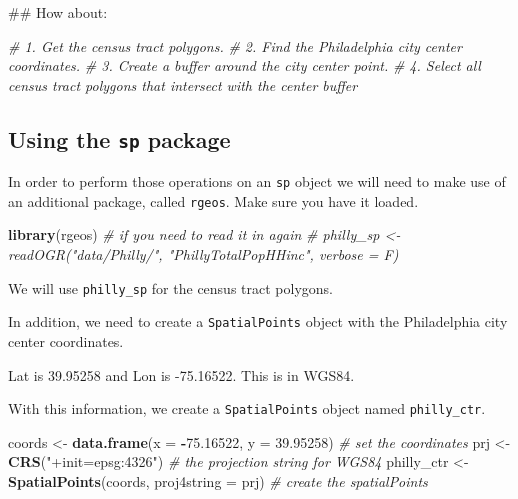 \documentclass[]{book}
\newenvironment{Shaded}{\begin{snugshade}}{\end{snugshade}}
\newcommand{\KeywordTok}[1]{\textcolor[rgb]{0.13,0.29,0.53}{\textbf{#1}}}
\newcommand{\DataTypeTok}[1]{\textcolor[rgb]{0.13,0.29,0.53}{#1}}
\newcommand{\FloatTok}[1]{\textcolor[rgb]{0.00,0.00,0.81}{#1}}
\newcommand{\StringTok}[1]{\textcolor[rgb]{0.31,0.60,0.02}{#1}}
\newcommand{\CommentTok}[1]{\textcolor[rgb]{0.56,0.35,0.01}{\textit{#1}}}
\newcommand{\OperatorTok}[1]{\textcolor[rgb]{0.81,0.36,0.00}{\textbf{#1}}}
\newcommand{\NormalTok}[1]{#1}
\theoremstyle{definition}
\theoremstyle{definition}
\theoremstyle{definition}
\theoremstyle{remark}
\begin{document}
\begin{Shaded}
\begin{Highlighting}[]
\NormalTok{## How about:}

\CommentTok{# 1. Get the census tract polygons.}
\CommentTok{# 2. Find the Philadelphia city center coordinates.}
\CommentTok{# 3. Create a buffer around the city center point.}
\CommentTok{# 4. Select all census tract polygons that intersect with the center buffer}
\end{Highlighting}
\end{Shaded}

\subsection{\texorpdfstring{Using the \texttt{sp}
package}{Using the sp package}}\label{using-the-sp-package}

In order to perform those operations on an \texttt{sp} object we will
need to make use of an additional package, called \texttt{rgeos}. Make
sure you have it loaded.

\begin{Shaded}
\begin{Highlighting}[]
\KeywordTok{library}\NormalTok{(rgeos)}
\CommentTok{# if you need to read it in again}
\CommentTok{# philly_sp <- readOGR("data/Philly/", "PhillyTotalPopHHinc", verbose = F)}
\end{Highlighting}
\end{Shaded}

We will use \texttt{philly\_sp} for the census tract polygons.

In addition, we need to create a \texttt{SpatialPoints} object with the
Philadelphia city center coordinates.

Lat is 39.95258 and Lon is -75.16522. This is in WGS84.

With this information, we create a \texttt{SpatialPoints} object named
\texttt{philly\_ctr}.

\begin{Shaded}
\begin{Highlighting}[]
\NormalTok{coords <-}\StringTok{ }\KeywordTok{data.frame}\NormalTok{(}\DataTypeTok{x =} \OperatorTok{-}\FloatTok{75.16522}\NormalTok{, }\DataTypeTok{y =} \FloatTok{39.95258}\NormalTok{) }\CommentTok{# set the coordinates}
\NormalTok{prj <-}\StringTok{ }\KeywordTok{CRS}\NormalTok{(}\StringTok{"+init=epsg:4326"}\NormalTok{) }\CommentTok{# the projection string for WGS84}
\NormalTok{philly_ctr <-}\StringTok{ }\KeywordTok{SpatialPoints}\NormalTok{(coords, }\DataTypeTok{proj4string =}\NormalTok{ prj) }\CommentTok{# create the spatialPoints}
\end{Highlighting}
\end{Shaded}
\end{document}
